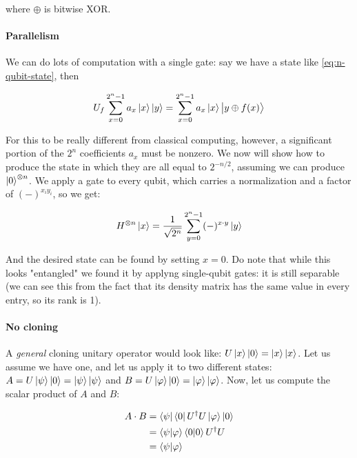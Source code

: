 \documentclass[main.tex]{subfiles}
\begin{document}
where \(\oplus\) is bitwise XOR.

\paragraph{Parallelism}

We can do lots of computation with a single gate: say we have a state like \eqref{eq:n-qubit-state}, then

\begin{equation}
    U_f \sum _{x=0}^{2^n-1} a_x \ket{x} \ket{y}  = \sum _{x=0}   ^{2^n-1} a_x \ket{x} \ket{y \oplus f(x)}
\end{equation}

For this to be really different from classical computing, however, a significant portion of the \(2^n\) coefficients \(a_x\) must be nonzero. We now will show how to produce the state in which they are all equal to \(2^{-n/2}\), assuming we can produce \(\ket{0} ^{\otimes n}\). We apply a  gate to every qubit, which carries a normalization and a factor of \((-)^{x_i y_i}\), so we get:

\begin{equation}
    H ^{\otimes n} \ket{x} = \frac{1}{\sqrt{2^n} } \sum _{y=0}   ^{2^n -1} (-)^{x\cdot y} \ket{y}
\end{equation}

And the desired state can be found by setting \(x = 0\). Do note that while this looks "entangled" we found it by applyng single-qubit gates: it is still separable (we can see this from the fact that its density matrix has the same value in every entry, so its rank is 1).

\paragraph{No cloning}

A  \emph{general}  cloning unitary operator would look like: \(U \ket{x} \ket{0} = \ket{x} \ket{x} \).
Let us assume we have one, and let us apply it to two different states: \(A = U\ket{\psi}\ket{0}=\ket{\psi} \ket{\psi }  \) and \(B = U\ket{\varphi} \ket{0} = \ket{\varphi} \ket{\varphi} \). Now, let us compute the scalar product of \(A\) and \(B\):

\begin{subequations}
\begin{align}
  A \cdot B &= \bra{\psi} \bra{0} U^\dag  U\ket{\varphi} \ket{0}  \\
  &= \braket{\psi}{\varphi} \braket{0}{0} U^\dag U  \\
  &= \braket{\psi}{\varphi}
\end{align}
\end{subequations}
\end{document}
